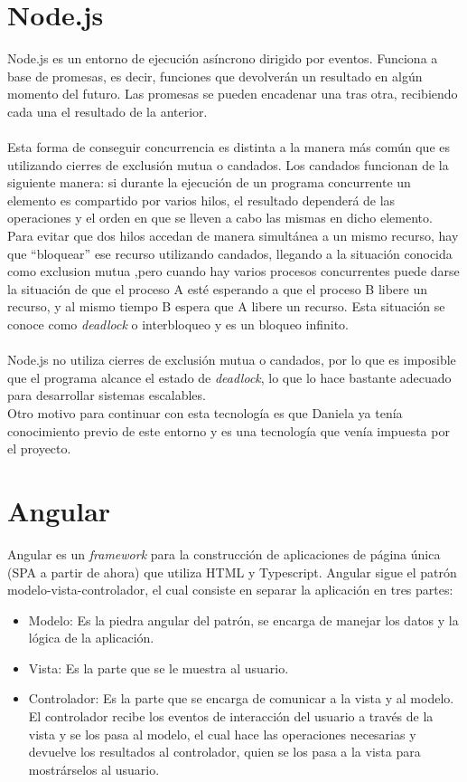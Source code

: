 \documentclass[11pt]{book}
\begin{document}
\section{Node.js} 
Node.js \cite{ref7} es un entorno de ejecución asíncrono dirigido por eventos. Funciona a base de promesas, es decir, funciones que devolverán un resultado en algún momento del futuro. Las promesas se pueden encadenar una tras otra, recibiendo cada una el resultado de la anterior.\\\\
Esta forma de conseguir concurrencia es distinta a la manera más común que es utilizando cierres de exclusión mutua o candados. Los candados funcionan de la siguiente manera: si durante la ejecución de un programa concurrente un elemento es compartido por varios hilos, el resultado dependerá de las operaciones y el orden en que se lleven a cabo las mismas en dicho elemento. Para evitar que dos hilos accedan de manera simultánea a un mismo recurso, hay que ``bloquear'' ese recurso utilizando candados, llegando a la situación conocida como exclusion mutua ,pero cuando hay varios procesos concurrentes puede darse la situación de que el proceso A esté esperando a que el proceso B libere un recurso, y al mismo tiempo B espera que A libere un recurso. Esta situación se conoce como \emph{deadlock} o interbloqueo y es un bloqueo infinito.\\\\
Node.js no utiliza cierres de exclusión mutua o candados, por lo que es imposible que el programa alcance el estado de \emph{deadlock}, lo que lo hace bastante adecuado para desarrollar sistemas escalables.\\
Otro motivo para continuar con esta tecnología es que Daniela ya tenía conocimiento previo de este entorno y es una tecnología que venía impuesta por el proyecto.

\section{Angular}
Angular es un \emph{framework} para la construcción de aplicaciones de página única (SPA a partir de ahora) que utiliza HTML y Typescript. Angular sigue el patrón modelo-vista-controlador, el cual consiste en separar la aplicación en tres partes:
\begin{itemize}
	\item Modelo: Es la piedra angular del patrón, se encarga de manejar los datos y la lógica de la aplicación.
	\item Vista: Es la parte que se le muestra al usuario.
	\item Controlador: Es la parte que se encarga de comunicar a la vista y al modelo. El controlador recibe los eventos de interacción del usuario a través de la vista y se los pasa al modelo, el cual hace las operaciones necesarias y devuelve los resultados al controlador, quien se los pasa a la vista para mostrárselos al usuario.
\end{itemize}
\end{document}
